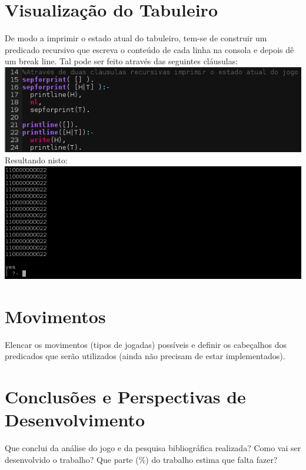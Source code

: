 \documentclass[a4paper]{article}
\begin{document}
\section{Visualização do Tabuleiro}
De modo a imprimir o estado atual do tabuleiro, tem-se de construir um predicado recursivo que escreva o conteúdo de cada linha na consola e depois dê um break line. Tal pode ser feito através das seguintes cláusulas:
\\\linebreak
\includegraphics[scale=0.77]{imprimir.png}
\\\linebreak
Resultando nisto:
\includegraphics[scale=0.55]{tabuleiro.png}


\section{Movimentos}
Elencar os movimentos (tipos de jogadas) possíveis e definir os cabeçalhos dos predicados que serão utilizados (ainda não precisam de estar implementados).

\section{Conclusões e Perspectivas de Desenvolvimento}
Que conclui da análise do jogo e da pesquisa bibliográfica realizada? Como vai ser desenvolvido o trabalho? Que parte (\%) do trabalho estima que falta fazer?
\end{document}
